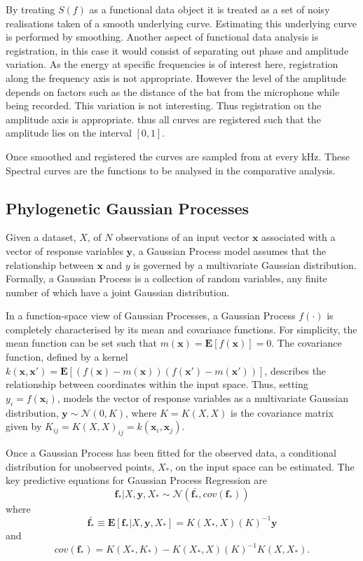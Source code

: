 \documentclass[wsdraft]{ws-rv9x6} %
\begin{document}
By treating \(S(f)\) as a functional data object it is treated as a set of noisy realisations taken of a smooth underlying curve. Estimating this underlying curve is performed by smoothing. Another aspect of functional data analysis is registration, in this case it would consist of separating out phase and amplitude variation. As the energy at specific frequencies is of interest here, registration along the frequency axis is not appropriate. However the level of the amplitude depends on factors such as the distance of the bat from the microphone while being recorded. This variation is not interesting. Thus registration on the amplitude axis is appropriate. thus all curves are registered such that the amplitude lies on the interval \([0,1]\). 

Once smoothed and registered the curves are sampled from at every kHz. These Spectral curves are the functions to be analysed in the comparative analysis.

\subsection{Phylogenetic Gaussian Processes}

Given a dataset, \(X\), of \(N\) observations of an input vector \(\mathbf{x}\) associated with a vector of response variables \(\mathbf{y}\), a Gaussian Process model assumes that the relationship between \(\mathbf{x}\) and \(y\) is governed by a multivariate Gaussian distribution. Formally, a Gaussian Process is a collection of random variables, any finite number of which have a joint Gaussian distribution.\cite{rasmussen2006gaussian} 

In a function-space view of Gaussian Processes, a Gaussian Process \(f(\cdot)\) is completely characterised by its mean and covariance functions. For simplicity, the mean function can be set such that \(m(\mathbf{x}) = \mathbf{E} [f(\mathbf{x})] = 0\). The covariance function, defined by a kernel \(k(\mathbf{x}, \mathbf{x}') = \mathbf{E}[(f(\mathbf{x}) - m(\mathbf{x}))(f(\mathbf{x'}) - m(\mathbf{x'}))] \), describes the relationship between coordinates within the input space. Thus, setting \(y_i = f(\mathbf{x}_i)\), models the vector of response variables as a multivariate Gaussian distribution, \(\mathbf{y} \sim \mathcal{N}(0, K)\), where \(K = K(X, X)\) is the covariance matrix given by \(K_{ij} = K(X, X)_{ij} = k(\mathbf{x}_i, \mathbf{x}_j)\). 

Once a Gaussian Process has been fitted for the observed data, a conditional distribution for unobserved points, \(X_*\), on the input space can be estimated. The key predictive equations for Gaussian Process Regression are
\[
\mathbf{f}_* | X, \mathbf{y}, X_* \sim \mathcal{N}(\bar{\mathbf{f}_*}, cov(\mathbf{f}_*))
\]
where
\[
\bar{\mathbf{f}_*} \equiv \mathbf{E} [\mathbf{f}_* | X, \mathbf{y}, X_*] = K(X_*, X) (K)^{-1} \mathbf{y}
\]
and
\[
cov(\mathbf{f}_*) = K(X_*, K_*) - K(X_*, X) (K)^{-1} K(X, X_*).
\]
\end{document}
